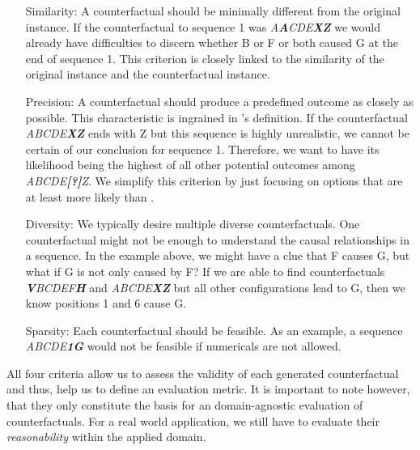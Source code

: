 \documentclass[./../../paper.tex]{subfiles}
\begin{document}
\begin{itemize}
    \item[Similarity:] A counterfactual should be minimally different from the original instance. If the counterfactual to sequence 1 was \textit{A\textbf{A}CDE\textbf{XZ}} we would already have difficulties to discern whether B or F or both caused G at the end of sequence 1. This criterion is closely linked to the similarity of the original instance and the counterfactual instance.
    \item[Precision:] A counterfactual should produce a predefined outcome as closely as possible. This characteristic is ingrained in \citeauthor{molnar2019}'s definition. If the counterfactual \textit{ABCDE\textbf{XZ}} ends with Z but this sequence is highly unrealistic, we cannot be certain of our conclusion for sequence 1. Therefore, we want to have its likelihood being the highest of all other potential outcomes among \textit{ABCDE\textbf{[?]}Z}. We simplify this criterion by just focusing on options that are at least more likely than .
    \item[Diversity:] We typically desire multiple diverse counterfactuals.  One counterfactual might not be enough to understand the causal relationships in a sequence. In the example above, we might have a clue that F causes G, but what if G is not only caused by F? If we are able to find counterfactuals \textit{\textbf{V}BCDEF\textbf{H}} and \textit{ABCDE\textbf{XZ}} but all other configurations lead to G, then we know positions 1 and 6 cause G. 
    \item[Sparsity:] Each counterfactual should be feasible. As an example, a sequence \textit{ABCDE\textbf{1G}} would not be feasible if numericals are not allowed. 
\end{itemize}

All four criteria allow us to assess the validity of each generated counterfactual and thus, help us to define an evaluation metric. It is important to note however, that they only constitute the basis for an domain-agnostic evaluation of counterfactuals. For a real world application, we still have to evaluate their \emph{reasonability} within the applied domain.
\end{document}
